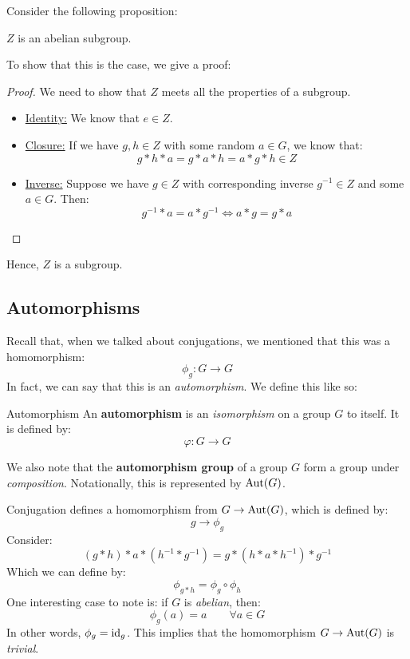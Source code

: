\documentclass[letterpaper]{article}
\begin{document}
Consider the following proposition: 
\begin{mdframed}
    \begin{proposition}
        $Z$ is an abelian subgroup. 
    \end{proposition}
\end{mdframed}
To show that this is the case, we give a proof: 
\begin{mdframed}
    \begin{proof}
        We need to show that $Z$ meets all the properties of a subgroup. 
        \begin{itemize}
            \item \underline{Identity:} We know that $e \in Z$. 
            \item \underline{Closure:} If we have $g, h \in Z$ with some random $a \in G$, we know that: 
            \[g * h * a = g * a * h = a * g * h \in Z\]
            \item \underline{Inverse:} Suppose we have $g \in Z$ with corresponding inverse $g^{-1} \in Z$ and some $a \in G$. Then: 
            \[g^{-1} * a = a * g^{-1} \iff a * g = g * a\]
        \end{itemize}
    \end{proof}
    Hence, $Z$ is a subgroup. 
\end{mdframed}

\subsection{Automorphisms}
Recall that, when we talked about conjugations, we mentioned that this was a homomorphism: 
\[\phi_g: G \to G\]
In fact, we can say that this is an \emph{automorphism}. We define this like so: 
\begin{definition}{Automorphism}{}
    An \textbf{automorphism} is an \emph{isomorphism} on a group $G$ to itself. It is defined by: 
    \[\varphi: G \to G\]
\end{definition}
We also note that the \textbf{automorphism group} of a group $G$ form a group under \emph{composition}. Notationally, this is represented by $\operatorname{Aut}(G)$.

\bigskip 

Conjugation defines a homomorphism from $G \to \operatorname{Aut}(G)$, which is defined by: 
\[g \to \phi_g\]
Consider:
\[(g * h) * a * (h^{-1} * g^{-1}) = g * (h * a * h^{-1}) * g^{-1}\]
Which we can define by: 
\[\phi_{g * h} = \phi_g \circ \phi_h\]
One interesting case to note is: if $G$ is \emph{abelian}, then: 
\[\phi_g (a) = a \qquad \forall a \in G\]
In other words, $\phi_g = \operatorname{id}_g$. This implies that the homomorphism $G \to \operatorname{Aut}(G)$ is \emph{trivial}.
\end{document}
